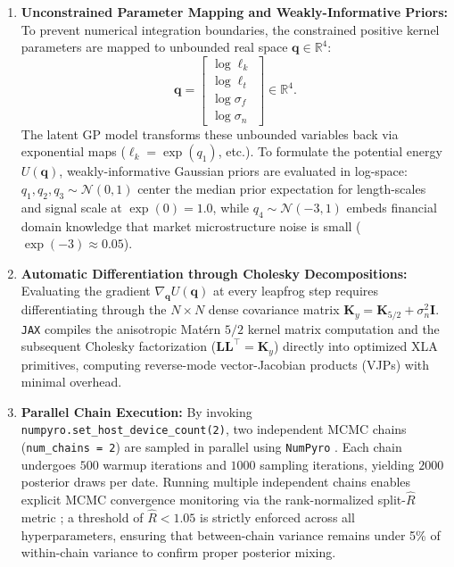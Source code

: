 \documentclass[12pt,oneside]{report}
\theoremstyle{definition}
\theoremstyle{remark}
\begin{document}
\begin{enumerate}
    \item \textbf{Unconstrained Parameter Mapping and Weakly-Informative Priors:} To prevent numerical integration boundaries, the constrained positive kernel parameters are mapped to unbounded real space $\mathbf{q} \in \mathbb{R}^4$:
\begin{equation}
    \mathbf{q} = \begin{bmatrix} 
    \log \ell_k \\ 
    \log \ell_t \\ 
    \log \sigma_f \\ 
    \log \sigma_n 
    \end{bmatrix} \in \mathbb{R}^4.
\end{equation}
The latent GP model transforms these unbounded variables back via exponential maps ($\ell_k = \exp(q_1)$, etc.). To formulate the potential energy $U(\mathbf{q})$, weakly-informative Gaussian priors are evaluated in log-space: $q_1, q_2, q_3 \sim \mathcal{N}(0, 1)$ center the median prior expectation for length-scales and signal scale at $\exp(0) = 1.0$, while $q_4 \sim \mathcal{N}(-3, 1)$ embeds financial domain knowledge that market microstructure noise is small ($\exp(-3) \approx 0.05$).

    \item \textbf{Automatic Differentiation through Cholesky Decompositions:} Evaluating the gradient $\nabla_{\mathbf{q}} U(\mathbf{q})$ at every leapfrog step requires differentiating through the $N \times N$ dense covariance matrix $\mathbf{K}_y = \mathbf{K}_{5/2} + \sigma_n^2 \mathbf{I}$. \texttt{JAX} compiles the anisotropic Matérn $5/2$ kernel matrix computation and the subsequent Cholesky factorization ($\mathbf{L}\mathbf{L}^\top = \mathbf{K}_y$) directly into optimized XLA primitives, computing reverse-mode vector-Jacobian products (VJPs) with minimal overhead.
    
    \item \textbf{Parallel Chain Execution:} By invoking \texttt{numpyro.set\_host\_device\_count(2)}, two independent MCMC chains (\texttt{num\_chains = 2}) are sampled in parallel using \texttt{NumPyro} \cite{phan2019numpyro}. Each chain undergoes $500$ warmup iterations and $1000$ sampling iterations, yielding $2000$ posterior draws per date. Running multiple independent chains enables explicit MCMC convergence monitoring via the rank-normalized split-$\hat{R}$ metric \cite{vehtari2021rank}; a threshold of $\hat{R} < 1.05$ is strictly enforced across all hyperparameters, ensuring that between-chain variance remains under 5\% of within-chain variance to confirm proper posterior mixing.
\end{enumerate}
\end{document}
